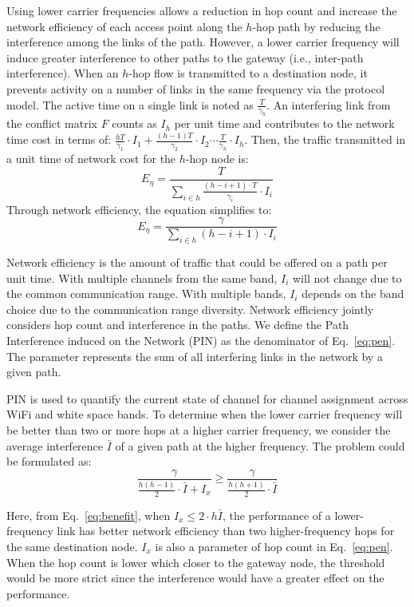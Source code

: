 Using lower carrier frequencies allows a reduction in hop count and increase the network efficiency of each 
access point along the $h$-hop path by reducing the interference among the links of the path. However, a lower 
carrier frequency will induce greater interference to other paths to the gateway (i.e., inter-path interference). 
When an $h$-hop flow is transmitted to a destination node, it prevents activity on a number of links in the 
same frequency via the protocol model. The active time on a single link is noted as $\frac{T}{\gamma_h}$. 
An interfering link from the conflict matrix $F$ counts as $I_h$ per unit time and contributes to the network 
time cost in terms of:
$\frac{hT}{\gamma_1}\cdot I_1 + \frac{(h-1)T}{\gamma_2}\cdot I_2 \cdots \frac{T}{\gamma_h}\cdot I_h$.
Then, the traffic transmitted in a unit time of network cost for the $h$-hop node is:
\begin{equation}
\label{eq:originpen}
E_{\eta}=\frac{T}{\sum_{i \in h}\frac{(h-i+1)\cdot T}{\gamma_i}\cdot I_i }
\end{equation}
Through network efficiency, the equation simplifies to:
\begin{equation}
\label{eq:pen}
E_{\eta}=\frac{\gamma}{\sum_{i \in h} (h-i+1)\cdot I_i}
\end{equation}

Network efficiency is the amount of traffic that could be offered on a path per unit time. With 
multiple channels from the same band, $I_i$ will not change due to the common communication 
range. With multiple bands, $I_i$ depends on the band choice due to the communication range 
diversity. Network efficiency jointly considers hop count and interference in the paths. We define
the Path Interference induced on the Network (PIN) as the denominator of Eq.~\ref{eq:pen}.
The parameter represents the sum of all interfering links in the network by a given path. 

PIN is used to quantify the current state of channel for channel assignment across WiFi and 
white space bands. To determine when the lower carrier frequency will be better than two or 
more hops at a higher carrier frequency, we consider the average interference $\bar{I}$ of 
a given path at the higher frequency. The problem could be formulated as:
\begin{equation}
\label{eq:benefit}
\frac{\gamma}{\frac{h(h-1)}{2}\cdot \bar{I}+I_x} \geq \frac{\gamma}{\frac{h(h+1)}{2}\cdot \bar{I}}
\end{equation}

Here, from Eq.~\ref{eq:benefit}, when $I_x \leq 2\cdot h\bar{I}$, the performance of a 
lower-frequency link has better network efficiency than two higher-frequency hops for 
the same destination node. $I_x$ is also a parameter of hop count in Eq.~\ref{eq:pen}. 
When the hop count is lower which closer to the gateway node, the threshold would be 
more strict since the interference would have a greater effect on the performance.


